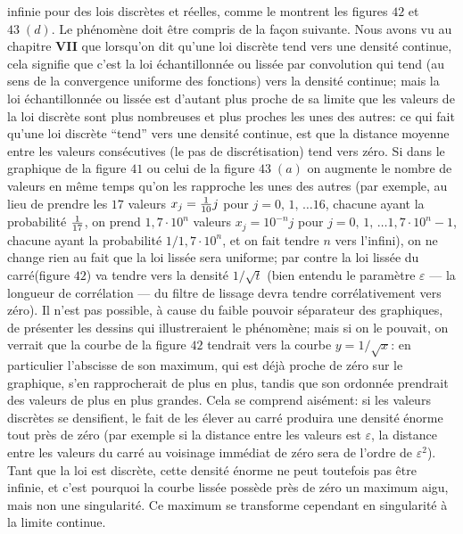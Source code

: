 {infinie pour des lois discr\`etes et r\'eelles,  comme le montrent les
figures $42$ et $43\; (d)$.  Le ph\'enom\`ene doit \^etre compris de la 
fa\c{c}on suivante.  Nous avons vu au chapitre {\bf VII} que lorsqu'on dit
qu'une loi discr\`ete tend vers une densit\'e continue,  cela signifie que
c'est la loi \'echantillonn\'ee ou liss\'ee par convolution qui tend (au 
sens de la convergence uniforme des fonctions) vers la densit\'e continue;
mais la loi \'echantillonn\'ee ou liss\'ee est d'autant plus proche de sa
limite que les valeurs de la loi discr\`ete sont plus nombreuses et plus
proches les unes des autres:  ce qui fait qu'une loi discr\`ete ``tend''
vers une densit\'e continue,  est que la distance moyenne entre les valeurs
cons\'ecutives (le pas de discr\'etisation) tend vers z\'ero.  Si dans le
graphique de la figure $41$ ou celui de la figure $43\; (a)$ on augmente 
le nombre de valeurs en m\^eme temps qu'on les rapproche les unes des
autres (par exemple,  au lieu de prendre les $17$ valeurs $x_j = {1\over
10}j$ pour $j=0,\, 1,\, \ldots 16$,  chacune ayant la probabilit\'e ${1 \over
17}$,  on prend $1,7 \cdot 10^{n}$ valeurs $x_j = 10^{-n}j$ pour $j=0,\,
1,\, \ldots 1,7 \cdot 10^n-1$,  chacune ayant la probabilit\'e $1/1,7\cdot
10^n$, et on fait tendre $n$ vers l'infini),  on ne change rien au fait
que la
loi liss\'ee sera uniforme;  par contre la loi liss\'ee du carr\'e(figure
$42$) va tendre vers la densit\'e $1 / \sqrt{t}$ (bien entendu le
param\`etre $\varepsilon$ --- la longueur de corr\'elation --- du filtre 
de lissage devra tendre corr\'elativement vers z\'ero).  Il n'est pas
possible,  \`a cause du faible pouvoir s\'eparateur des graphiques,  de
pr\'esenter les dessins qui illustreraient le ph\'enom\`ene;  mais si on le
pouvait,  on verrait que la courbe de la figure $42$ tendrait vers la courbe 
$y = 1 / \sqrt{x}$:  en particulier l'abscisse de son maximum,  qui est
d\'ej\`a proche de z\'ero sur le graphique, s'en rapprocherait de plus en
plus,  tandis que son ordonn\'ee prendrait des valeurs de plus en plus
grandes.  Cela se comprend ais\'ement:  si les valeurs discr\`etes se
densifient,  le fait de les \'elever au carr\'e produira une densit\'e 
\'enorme tout pr\`es de z\'ero (par exemple si la distance entre les 
valeurs est $\varepsilon$,  la distance entre les valeurs du carr\'e au
voisinage imm\'ediat de z\'ero sera de l'ordre de $\varepsilon^2$).  Tant 
que la loi est discr\`ete,  cette densit\'e \'enorme ne peut toutefois pas
\^etre infinie,  et c'est pourquoi la courbe liss\'ee poss\`ede pr\`es de 
z\'ero un maximum aigu,  mais non une singularit\'e.  Ce maximum se
transforme cependant en singularit\'e \`a la limite continue. 
\medskip

}
